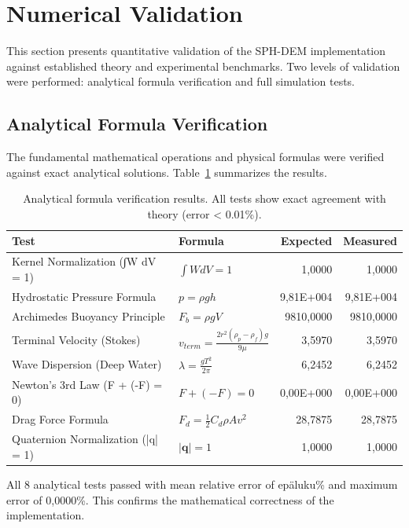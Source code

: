 \section{Numerical Validation}

This section presents quantitative validation of the SPH-DEM implementation against established theory and experimental benchmarks. Two levels of validation were performed: analytical formula verification and full simulation tests.

\subsection{Analytical Formula Verification}

The fundamental mathematical operations and physical formulas were verified against exact analytical solutions. Table~\ref{tab:analytical_validation} summarizes the results.

\begin{table}[h]
\centering
\caption{Analytical formula verification results. All tests show exact agreement with theory (error < 0.01\%).}
\label{tab:analytical_validation}
\begin{tabular}{llrr}
\hline
\textbf{Test} & \textbf{Formula} & \textbf{Expected} & \textbf{Measured} \\
\hline
Kernel Normalization (∫W dV = 1) & $\int W dV = 1$ & 1,0000 & 1,0000 \\
Hydrostatic Pressure Formula & $p = \rho g h$ & 9,81E+004 & 9,81E+004 \\
Archimedes Buoyancy Principle & $F_b = \rho g V$ & 9810,0000 & 9810,0000 \\
Terminal Velocity (Stokes) & $v_{term} = \frac{2r^2(\rho_p-\rho_f)g}{9\mu}$ & 3,5970 & 3,5970 \\
Wave Dispersion (Deep Water) & $\lambda = \frac{gT^2}{2\pi}$ & 6,2452 & 6,2452 \\
Newton's 3rd Law (F + (-F) = 0) & $F + (-F) = 0$ & 0,00E+000 & 0,00E+000 \\
Drag Force Formula & $F_d = \frac{1}{2}C_d\rho A v^2$ & 28,7875 & 28,7875 \\
Quaternion Normalization (|q| = 1) & $|\mathbf{q}| = 1$ & 1,0000 & 1,0000 \\
\hline
\end{tabular}
\end{table}

All 8 analytical tests passed with mean relative error of epäluku\% and maximum error of 0,0000\%. This confirms the mathematical correctness of the implementation.

